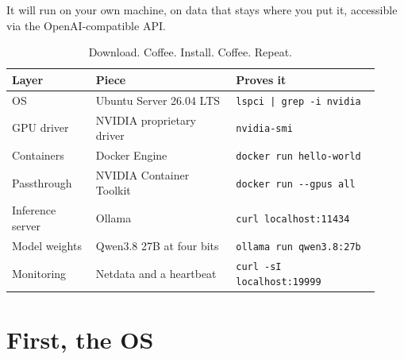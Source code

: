  It will run on your own machine, 
on data that stays where you put it, accessible via the OpenAI-compatible API. 


\vspace{2\baselineskip}
\begin{table}[!ht]
\centering
\begin{tabular}{p{0.21\linewidth}p{0.35\linewidth}p{0.36\linewidth}}
    \toprule
    \textbf{Layer} & \textbf{Piece} & \textbf{Proves it} \\
    \midrule
    OS & Ubuntu Server 26.04 LTS & \texttt{lspci | grep -i nvidia} \\
    GPU driver & NVIDIA proprietary driver & \texttt{nvidia-smi} \\
    Containers & Docker Engine & \texttt{docker run hello-world} \\
    Passthrough & NVIDIA Container Toolkit & \texttt{docker run -{}-gpus all} \\
    Inference server & Ollama & \texttt{curl localhost:11434} \\
    Model weights & Qwen3.8 27B at four bits & \texttt{ollama run qwen3.8:27b} \\
    Monitoring & Netdata and a heartbeat & \texttt{curl -sI localhost:19999} \\
    \bottomrule
\end{tabular}
\vspace{1.5em}
\caption{Download. Coffee. Install. Coffee. Repeat.} \label{tab:stack}
\end{table}


\clearpage
\section{First, the OS}




